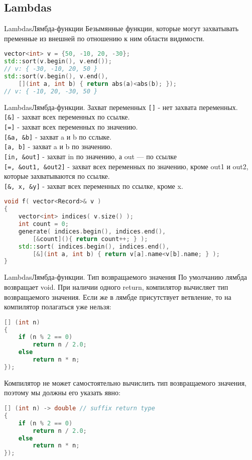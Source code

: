 \documentclass[10pt]{beamer}
\begin{document}
\subsection{Lambdas}
\hypertarget{Lambdas}{}
\begin{frame}[fragile]{Lambdas}{Лямбда-функции}
Безымянные функции, которые могут захватывать пременные из внешней по отношению к ним области видимости.
\begin{lstlisting}[language=C++]
vector<int> v = {50, -10, 20, -30};
std::sort(v.begin(), v.end());
// v: { -30, -10, 20, 50 }
std::sort(v.begin(), v.end(), 
    [](int a, int b) { return abs(a)<abs(b); });
// v: { -10, 20, -30, 50 }
\end{lstlisting}
\end{frame}
\begin{frame}[fragile]{Lambdas}{Лямбда-функции. Захват переменных}
\texttt{[]} - нет захвата переменных.\\\texttt{[\&]} - захват всех переменных по ссылке.\\ \texttt{[=]} - захват всех переменных по значению.\\ \texttt{[\&a, \&b]} - захват a и b  по сслыке.\\ \texttt{[a, b]} - захват a и b по значению.\\\texttt{[in, \&out]} - захват in по значению, а out — по ссылке\\ \texttt{[=, \&out1, \&out2]} - захват всех переменных по значению, кроме out1 и out2, которые захватываются по ссылке.\\\texttt{[\&, x, \&y]} - захват всех переменных по ссылке, кроме x.
\begin{lstlisting}[language=C++]
void f( vector<Record>& v )
{
    vector<int> indices( v.size() );
    int count = 0;
    generate( indices.begin(), indices.end(), 
        [&count](){ return count++; } );
    std::sort( indices.begin(), indices.end(), 
        [&](int a, int b) { return v[a].name<v[b].name; } );
}
\end{lstlisting}
\end{frame}
\begin{frame}[fragile]{Lambdas}{Лямбда-функции. Тип возвращаемого значения}
По умолчанию лямбда возвращает void. При наличии одного return, компилятор вычисляет тип возвращаемого значения. Если же в лямбде присутствует ветвление, то на компилятор полагаться уже нельзя:
\begin{lstlisting}[language=C++]
[] (int n) 
{ 
    if (n % 2 == 0)
        return n / 2.0;
    else
        return n * n;
});
\end{lstlisting}
Компилятор не может самостоятельно вычислить тип возвращаемого значения, поэтому мы должны его указать явно:
\begin{lstlisting}[language=C++]
[] (int n) -> double // suffix return type
{ 
    if (n % 2 == 0)
        return n / 2.0;
    else
        return n * n;
});
\end{lstlisting}
\end{frame}
\end{document}
